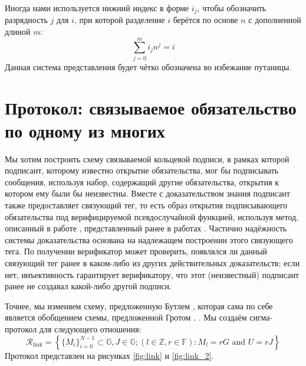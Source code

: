 \documentclass{article}
\newcommand{\G}{\mathbb{G}}
\newcommand{\F}{\mathbb{F}}
\theoremstyle{definition}
\begin{document}
Иногда нами используется нижний индекс в форме $i_j$, чтобы обозначить разрядность $j$ для $i$, при которой разделение $i$ берётся по основе $n$ с дополненной длиной $m$:
$$\sum_{j=0}^m i_j n^j = i$$
Данная система представления будет чётко обозначена во избежание путаницы.


\section{Протокол: связываемое обязательство по одному из многих}
Мы хотим построить схему связываемой кольцевой подписи, в рамках которой подписант, которому известно открытие обязательства, мог бы подписывать сообщения, используя набор, содержащий другие обязательства, открытия к котором ему были бы неизвестны. Вместе с доказательством знания подписант также предоставляет связующий тег, то есть образ открытия подписывающего обязательства под верифицируемой псевдослучайной функцией, используя метод, описанный в работе \cite{dodis}, представленный ранее в работах \cite{omniring,rct3}.
Частично надёжность системы доказательства основана на надлежащем построении этого связующего тега. По получении верификатор может проверить, появлялся ли данный связующий тег ранее в каком-либо из других действительных доказательств; если нет, инъективность гарантирует верификатору, что этот (неизвестный) подписант ранее не создавал какой-либо другой подписи.

Точнее, мы изменяем схему, предложенную Бутлем \cite{bootle}, которая сама по себе является обобщением схемы, предложенной Гротом \cite{groth}.
. Мы создаём сигма-протокол для следующего отношения:
$$\mathcal{R}_{\text{link}} = \left\{ \{M_i\}_{i=0}^{N-1} \subset \G, J \in \G ; (l \in \mathbb{Z},r \in \F) : M_l = rG \text{ and } U = rJ \right\}$$
Протокол представлен на рисунках \ref{fig:link} и \ref{fig:link_2}.
\end{document}
